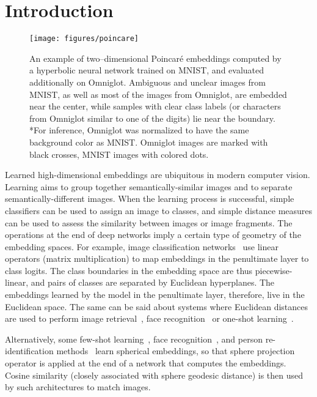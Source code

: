 \documentclass[10pt,twocolumn,letterpaper]{article}
\begin{document}
\section{Introduction}
\begin{figure}[htb!]
    \centering
    \texttt{[image: figures/poincare]}
    \caption{An example of two--dimensional Poincar\'e embeddings computed by a hyperbolic neural network trained on MNIST, and evaluated additionally on Omniglot. Ambiguous and unclear images from MNIST, as well as most of the images from Omniglot,  are embedded near the center, while samples with clear class labels (or characters from Omniglot similar to one of the digits) lie near the boundary. *For inference, Omniglot was normalized to have the same background color as MNIST. Omniglot images are marked with black crosses, MNIST images with colored dots.}
    \label{fig:teaser}
    \vspace{-5mm}
\end{figure}
Learned high-dimensional embeddings are ubiquitous in modern computer vision. Learning aims to group together semantically-similar images and to separate semantically-different images. When the learning process is successful, simple classifiers can be used to assign an image to classes, and simple distance measures can be used to assess the similarity between images or image fragments.
The operations at the end of deep networks imply a certain type of geometry of the embedding spaces. For example, image classification networks~\cite{krizhevsky2012imagenet, lecun1989generalization} use linear operators (matrix multiplication) to map embeddings in the penultimate layer to class logits. The class boundaries in the embedding space are thus piecewise-linear, and pairs of classes are separated by Euclidean hyperplanes. The embeddings learned by the model in the penultimate layer, therefore, live in the Euclidean space. The same can be said about systems where Euclidean distances are used to perform image retrieval~\cite{oh2016deep, sohn2016improved, wu2017sampling}, face recognition~\cite{Parkhi15, wen2016discriminative} or one-shot learning~\cite{snell2017prototypical_net}. 

Alternatively, some few-shot learning~\cite{nips2016_vinyals2016matching_net}, face recognition~\cite{schroff2015facenet}, and person re-identification methods~\cite{ustinova2016learning,Yi14} learn spherical embeddings, so that sphere projection operator is applied at the end of a network that computes the embeddings. Cosine similarity (closely associated with sphere geodesic distance) is then used by such architectures to match images.
\end{document}
